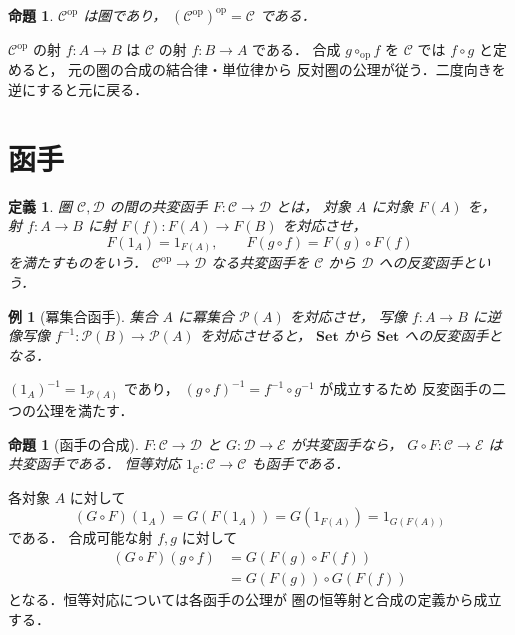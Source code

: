 \documentclass[a5paper,10pt,onecolumn]{jsarticle}
\makeatletter
\theoremstyle{mathnotetheorem}
\newtheorem{definition}[theorem]{定義}
\newtheorem{proposition}[theorem]{命題}
\newtheorem{example}[theorem]{例}
\renewcommand{\proofname}{証明}
\renewenvironment{proof}[1][\proofname]{%
  \par\pushQED{\qed}\normalfont\topsep4\p@\@plus2\p@\relax
  \trivlist\item[\hskip\labelsep\bfseries #1]\ignorespaces
}{\popQED\endtrivlist\@endpefalse}
\makeatother
\begin{document}
\begin{proposition}\label{prop:op}
$\mathcal C^{\mathrm{op}}$ は圏であり，
$(\mathcal C^{\mathrm{op}})^{\mathrm{op}}=\mathcal C$ である．
\end{proposition}
\begin{proof}
$\mathcal C^{\mathrm{op}}$ の射 $f:A\to B$ は
$\mathcal C$ の射 $f:B\to A$ である．
合成 $g\circ_{\mathrm{op}}f$ を
$\mathcal C$ では $f\circ g$ と定めると，
元の圏の合成の結合律・単位律から
反対圏の公理が従う．二度向きを逆にすると元に戻る．
\end{proof}

\section{函手}

\begin{definition}
圏 $\mathcal C,\mathcal D$ の間の\emph{共変函手}
$F:\mathcal C\to\mathcal D$ とは，
対象 $A$ に対象 $F(A)$ を，
射 $f:A\to B$ に射 $F(f):F(A)\to F(B)$ を対応させ，
\[
 F(1_A)=1_{F(A)},\qquad
 F(g\circ f)=F(g)\circ F(f)
\]
を満たすものをいう．
$\mathcal C^{\mathrm{op}}\to\mathcal D$ なる共変函手を
$\mathcal C$ から $\mathcal D$ への\emph{反変函手}という．
\end{definition}

\begin{example}[冪集合函手]
集合 $A$ に冪集合 $\mathcal P(A)$ を対応させ，
写像 $f:A\to B$ に逆像写像
$f^{-1}:\mathcal P(B)\to\mathcal P(A)$ を対応させると，
$\mathbf{Set}$ から $\mathbf{Set}$ への反変函手となる．
\end{example}
\begin{proof}
$(1_A)^{-1}=1_{\mathcal P(A)}$ であり，
$(g\circ f)^{-1}=f^{-1}\circ g^{-1}$ が成立するため
反変函手の二つの公理を満たす．
\end{proof}

\begin{proposition}[函手の合成]\label{prop:functor-comp}
$F:\mathcal C\to\mathcal D$ と
$G:\mathcal D\to\mathcal E$ が共変函手なら，
$G\circ F:\mathcal C\to\mathcal E$ は共変函手である．
恒等対応 $1_{\mathcal C}:\mathcal C\to\mathcal C$ も函手である．
\end{proposition}
\begin{proof}
各対象 $A$ に対して
\[
 (G\circ F)(1_A)=G(F(1_A))
 =G(1_{F(A)})=1_{G(F(A))}
\]
である．
合成可能な射 $f,g$ に対して
\begin{align*}
 (G\circ F)(g\circ f)
 &=G(F(g)\circ F(f))\\
 &=G(F(g))\circ G(F(f))
\end{align*}
となる．恒等対応については各函手の公理が
圏の恒等射と合成の定義から成立する．
\end{proof}
\end{document}
